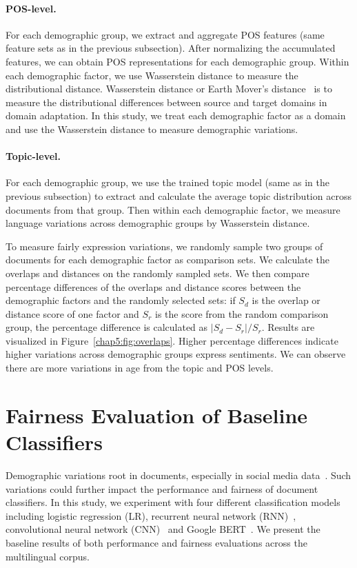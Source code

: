 \paragraph{POS-level.} For each demographic group, we extract and aggregate POS features (same feature sets as in the previous subsection). After normalizing the accumulated features, we can obtain POS representations for each demographic group. Within each demographic factor, we use Wasserstein distance to measure the distributional distance. Wasserstein distance or Earth Mover's distance~\cite{vallender1974calculation} is to measure the distributional differences between source and target domains in domain adaptation. In this study, we treat each demographic factor as a domain and use the Wasserstein distance to measure demographic variations.

\paragraph{Topic-level.} For each demographic group, we use the trained topic model (same as in the previous subsection) to extract and calculate the average topic distribution across documents from that group. Then within each demographic factor, we measure language variations across demographic groups by Wasserstein distance. 


To measure fairly expression variations, we randomly sample two groups of documents for each demographic factor as comparison sets. 
We calculate the overlaps and distances on the randomly sampled sets. 
We then compare percentage differences of the overlaps and distance scores between the demographic factors and the randomly selected sets: if $S_d$ is the overlap or distance score of one factor and $S_r$ is the score from the random comparison group, the percentage difference is calculated as $|S_d - S_r|/S_r$.
Results are visualized in Figure~\ref{chap5:fig:overlaps}. 
Higher percentage differences indicate higher variations across demographic groups express sentiments.
We can observe there are more variations in age from the topic and POS levels.


\section{Fairness Evaluation of Baseline Classifiers}
\label{chap5:sec:fair_eval}

Demographic variations root in documents, especially in social media data~\cite{volkova2013exploring,hovy2015demographic,johannsen2015cross}.
Such variations could further impact the performance and fairness of document classifiers.
In this study, we experiment with four different classification models including logistic regression (LR), recurrent neural network (RNN)~\cite{chung2014empirical}, convolutional neural network (CNN)~\cite{kim2014convolutional} and Google BERT~\cite{devlin2019bert}.
We present the baseline results of both performance and fairness evaluations across the multilingual corpus.

